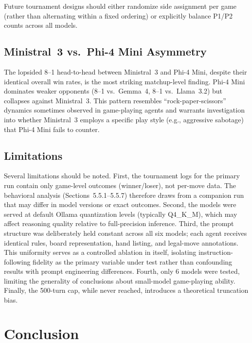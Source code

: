 \documentclass[11pt]{article}
\begin{document}
Future tournament designs should either randomize side assignment per game (rather than alternating within a fixed ordering) or explicitly balance P1/P2 counts across all models.

\subsection{Ministral~3 vs.\ Phi-4 Mini Asymmetry}

The lopsided 8--1 head-to-head between Ministral~3 and Phi-4 Mini, despite their identical overall win rates, is the most striking matchup-level finding. Phi-4 Mini dominates weaker opponents (8--1 vs.\ Gemma~4, 8--1 vs.\ Llama~3.2) but collapses against Ministral~3. This pattern resembles ``rock-paper-scissors'' dynamics sometimes observed in game-playing agents \cite{llm_games} and warrants investigation into whether Ministral~3 employs a specific play style (e.g., aggressive sabotage) that Phi-4 Mini fails to counter.

\subsection{Limitations}

Several limitations should be noted. First, the tournament logs for the primary run contain only game-level outcomes (winner/loser), not per-move data. The behavioral analysis (Sections~5.5.1--5.5.7) therefore draws from a companion run that may differ in model versions or exact outcomes. Second, the models were served at default Ollama quantization levels (typically Q4\_K\_M), which may affect reasoning quality relative to full-precision inference. Third, the prompt structure was deliberately held constant across all six models; each agent receives identical rules, board representation, hand listing, and legal-move annotations. This uniformity serves as a controlled ablation in itself, isolating instruction-following fidelity as the primary variable under test rather than confounding results with prompt engineering differences. Fourth, only 6 models were tested, limiting the generality of conclusions about small-model game-playing ability. Finally, the 500-turn cap, while never reached, introduces a theoretical truncation bias.

\section{Conclusion}
\label{sec:conclusion}
\end{document}
